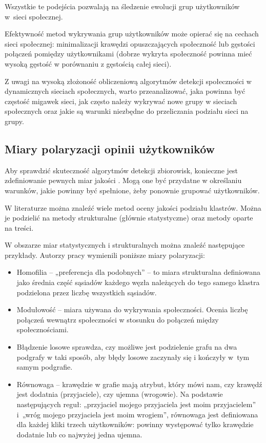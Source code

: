 Wszystkie te podejścia pozwalają na śledzenie ewolucji grup użytkowników w~sieci społecznej.

Efektywność metod wykrywania grup użytkowników może opierać się na cechach sieci społecznej: minimalizacji krawędzi opuszczających społeczność \cite{baltsou} lub gęstości połączeń pomiędzy użytkownikami (dobrze wykryta społeczność powinna mieć wysoką gęstość w porównaniu z gęstością całej sieci).

Z uwagi na wysoką złożoność obliczeniową algorytmów detekcji społeczności w dynamicznych sieciach społecznych, warto przeanalizować, jaka powinna być częstość migawek sieci, jak często należy wykrywać nowe grupy w sieciach społecznych oraz jakie są warunki niezbędne do przeliczania podziału sieci na grupy.


\subsection{Miary polaryzacji opinii użytkowników}\label{s1}

Aby sprawdzić skuteczność algorytmów detekcji zbiorowisk, konieczne jest zdefiniowanie pewnych miar jakości \cite{plantie}. Mogą one być przydatne w określaniu warunków, jakie powinny być spełnione, żeby ponownie grupować użytkowników.

W literaturze można znaleźć wiele metod oceny jakości podziału klastrów. Można je podzielić na metody strukturalne (głównie statystyczne) oraz metody oparte na treści.

W obszarze miar statystycznych i strukturalnych można znaleźć następujące przykłady. Autorzy pracy \cite{interian} wymienili poniższe miary polaryzacji:
\begin{itemize}
    \item Homofilia -- „preferencja dla podobnych” – to miara strukturalna definiowana jako średnia część sąsiadów każdego węzła należących do tego samego klastra podzielona przez liczbę wszystkich sąsiadów.
\item Modułowość -- miara używana do wykrywania społeczności. Ocenia liczbę połączeń wewnątrz społeczności w stosunku do połączeń między społecznościami.
\item Błądzenie losowe sprawdza, czy możliwe jest podzielenie grafu na dwa podgrafy w taki sposób, aby błędy losowe zaczynały się i kończyły w~tym samym podgrafie.
\item Równowaga -- krawędzie w grafie mają atrybut, który mówi nam, czy krawędź jest dodatnia (przyjaciele), czy ujemna (wrogowie). Na podstawie następujących reguł: „przyjaciel mojego przyjaciela jest moim przyjacielem” i~„wróg mojego przyjaciela jest moim wrogiem”, równowaga jest definiowana dla każdej kliki trzech użytkowników: powinny występować tylko krawędzie dodatnie lub co najwyżej jedna ujemna.
\end{itemize}

